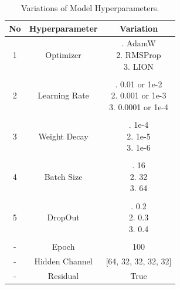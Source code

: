 \documentclass[10pt,TimesNewRoman,a4paper]{matrikenglish}
\begin{document}
\begin{table}[ht]
    \centering
    \caption{Variations of Model Hyperparameters.}
    \label{table:3. ablasi hyperparamter}
    \begin{tabular}{c c c}
        \hline
        \textbf{No} & \textbf{Hyperparameter} & \textbf{Variation} \\
        \hline
        1 & Optimizer & \parbox[t]{5cm}{. AdamW \\ 2. RMSProp \\ 3. LION} \\ \\
        2 & Learning Rate & \parbox[t]{4cm}{. 0.01 or 1e-2 \\ 2. 0.001 or 1e-3 \\ 3. 0.0001 or 1e-4} \\ \\
        3 & Weight Decay & \parbox[t]{4cm}{. 1e-4 \\ 2. 1e-5 \\ 3. 1e-6} \\ \\
        4 & Batch Size & \parbox[t]{4cm}{. 16 \\ 2. 32 \\ 3. 64} \\ \\
        5 & DropOut & \parbox[t]{4cm}{. 0.2 \\ 2. 0.3 \\ 3. 0.4} \\ \\
        - & Epoch & 100 \\
        - & Hidden Channel & [64, 32, 32, 32, 32] \\
        - & Residual & True \\
        \hline
    \end{tabular}
\end{table}
\end{document}
